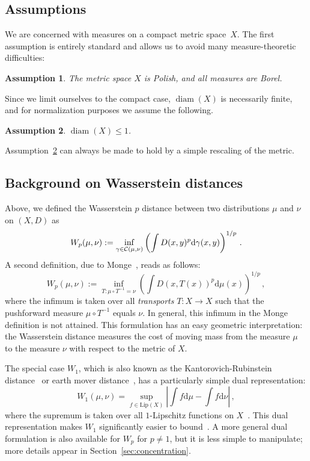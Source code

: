 \documentclass[sts]{imsart}
\newtheorem{assumption}{Assumption}{\it}{\rm}
\DeclareMathOperator{\diam}{diam}
\begin{document}
\subsection{Assumptions}
We are concerned with measures on a compact metric space~$X$.
The first assumption is entirely standard and allows us to avoid many measure-theoretic difficulties:
\begin{assumption}\label{assumption:polish}
The metric space $X$ is Polish, and all measures are Borel.
\end{assumption}

Since we limit ourselves to the compact case, $\diam(X)$ is necessarily finite, and for normalization purposes we assume the following.
\begin{assumption}\label{assumption:diameter}
$\diam(X) \leq 1$.
\end{assumption}
Assumption~\ref{assumption:diameter} can always be made to hold by a simple rescaling of the metric.

\subsection{Background on Wasserstein distances}
Above, we defined the Wasserstein $p$ distance between two distributions $\mu$ and $\nu$ on $(X, D)$ as
\begin{equation*}
W_p(\mu, \nu) := \inf_{\gamma \in \mathcal{C}(\mu, \nu)} \left(\int D(x, y)^p \mathrm{d}\gamma(x, y)\right)^{1/p}\,.
\end{equation*}
A second definition, due to Monge~\cite{Mon81,San15}, reads as follows:
\begin{equation*}
W_p(\mu, \nu) := \inf_{T: \mu \circ T^{-1} = \nu} \left(\int D(x, T(x))^p \mathrm{d}\mu(x)\right)^{1/p}\,,
\end{equation*}
where the infimum is taken over all \emph{transports} $T: X \to X$ such that the pushforward measure $\mu \circ T^{-1}$ equals $\nu$.
In general, this infimum in the Monge definition is not attained.
This formulation has an easy geometric interpretation: the Wasserstein distance measures the cost of moving mass from the measure $\mu$ to the measure $\nu$ with respect to the metric of $X$.

The special case $W_1$, which is also known as the Kantorovich-Rubinstein distance~\cite{Vil09} or earth mover distance~\cite{RubTomGui00}, has a particularly simple dual representation:
\begin{equation}\label{eqn:w1_dual}
W_1(\mu, \nu) = \sup_{f \in \mathrm{Lip}(X)} \left| \int f \mathrm d \mu - \int f \mathrm d \nu\right|\,,
\end{equation}
where the supremum is taken over all $1$-Lipschitz functions on $X$~\cite{KanRub58}.
This dual representation makes $W_1$ significantly easier to bound~\cite[Remark~6.6]{Vil09}.
A more general dual formulation is also available for $W_p$ for $p \neq 1$, but it is less simple to manipulate; more details appear in Section~\ref{sec:concentration}.
\end{document}
